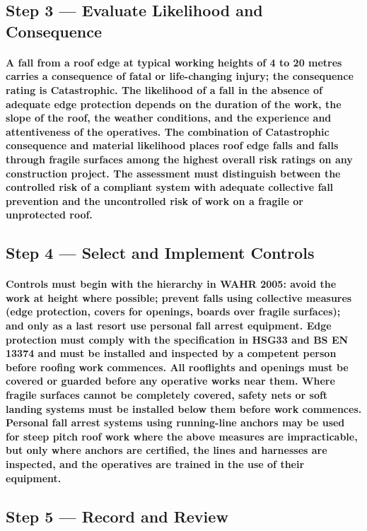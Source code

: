 \subsection{Step 3 --- Evaluate Likelihood and Consequence}
\paragraph{A fall from a roof edge at typical working heights of 4 to 20 metres carries a consequence of fatal or life-changing injury; the consequence rating is Catastrophic. The likelihood of a fall in the absence of adequate edge protection depends on the duration of the work, the slope of the roof, the weather conditions, and the experience and attentiveness of the operatives. The combination of Catastrophic consequence and material likelihood places roof edge falls and falls through fragile surfaces among the highest overall risk ratings on any construction project. The assessment must distinguish between the controlled risk of a compliant system with adequate collective fall prevention and the uncontrolled risk of work on a fragile or unprotected roof.}

\subsection{Step 4 --- Select and Implement Controls}
\paragraph{Controls must begin with the hierarchy in WAHR 2005: avoid the work at height where possible; prevent falls using collective measures (edge protection, covers for openings, boards over fragile surfaces); and only as a last resort use personal fall arrest equipment. Edge protection must comply with the specification in HSG33 and BS EN 13374 and must be installed and inspected by a competent person before roofing work commences. All rooflights and openings must be covered or guarded before any operative works near them. Where fragile surfaces cannot be completely covered, safety nets or soft landing systems must be installed below them before work commences. Personal fall arrest systems using running-line anchors may be used for steep pitch roof work where the above measures are impracticable, but only where anchors are certified, the lines and harnesses are inspected, and the operatives are trained in the use of their equipment.}

\subsection{Step 5 --- Record and Review}
